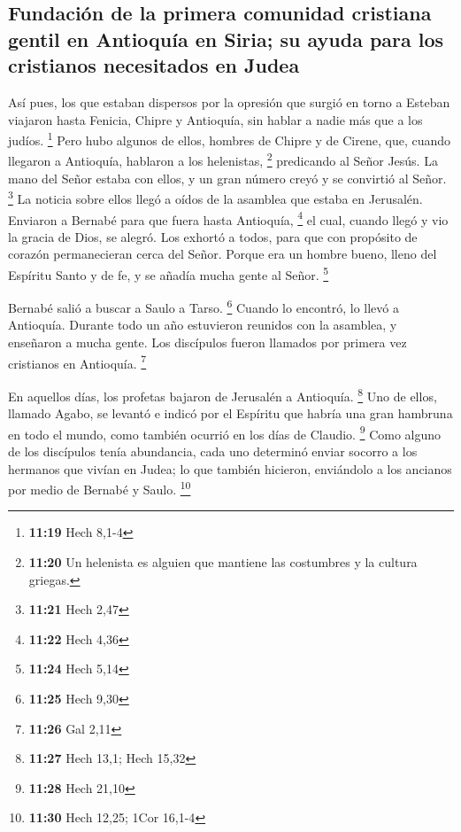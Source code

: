 \begin{paracol}{2}
\hypertarget{fundaciuxf3n-de-la-primera-comunidad-cristiana-gentil-en-antioquuxeda-en-siria-su-ayuda-para-los-cristianos-necesitados-en-judea}{%
\subsection{Fundación de la primera comunidad cristiana gentil en
Antioquía en Siria; su ayuda para los cristianos necesitados en
Judea}\label{fundaciuxf3n-de-la-primera-comunidad-cristiana-gentil-en-antioquuxeda-en-siria-su-ayuda-para-los-cristianos-necesitados-en-judea}}

 Así pues, los que estaban dispersos por la opresión que
surgió en torno a Esteban viajaron hasta Fenicia, Chipre y Antioquía,
sin hablar a nadie más que a los judíos. \footnote{\textbf{11:19} Hech
  8,1-4}  Pero hubo algunos de ellos, hombres de Chipre y
de Cirene, que, cuando llegaron a Antioquía, hablaron a los helenistas,
\footnote{\textbf{11:20} Un helenista es alguien que mantiene las
  costumbres y la cultura griegas.} predicando al Señor Jesús.
 La mano del Señor estaba con ellos, y un gran número
creyó y se convirtió al Señor. \footnote{\textbf{11:21} Hech 2,47}
 La noticia sobre ellos llegó a oídos de la asamblea que
estaba en Jerusalén. Enviaron a Bernabé para que fuera hasta Antioquía,
\footnote{\textbf{11:22} Hech 4,36}  el cual, cuando
llegó y vio la gracia de Dios, se alegró. Los exhortó a todos, para que
con propósito de corazón permanecieran cerca del Señor. 
Porque era un hombre bueno, lleno del Espíritu Santo y de fe, y se
añadía mucha gente al Señor. \footnote{\textbf{11:24} Hech 5,14}

 Bernabé salió a buscar a Saulo a Tarso. \footnote{\textbf{11:25}
  Hech 9,30}  Cuando lo encontró, lo llevó a Antioquía.
Durante todo un año estuvieron reunidos con la asamblea, y enseñaron a
mucha gente. Los discípulos fueron llamados por primera vez cristianos
en Antioquía. \footnote{\textbf{11:26} Gal 2,11}

 En aquellos días, los profetas bajaron de Jerusalén a
Antioquía. \footnote{\textbf{11:27} Hech 13,1; Hech 15,32}
 Uno de ellos, llamado Agabo, se levantó e indicó por el
Espíritu que habría una gran hambruna en todo el mundo, como también
ocurrió en los días de Claudio. \footnote{\textbf{11:28} Hech 21,10}
 Como alguno de los discípulos tenía abundancia, cada uno
determinó enviar socorro a los hermanos que vivían en Judea;
 lo que también hicieron, enviándolo a los ancianos por
medio de Bernabé y Saulo. \footnote{\textbf{11:30} Hech 12,25; 1Cor
  16,1-4}


\end{paracol}
